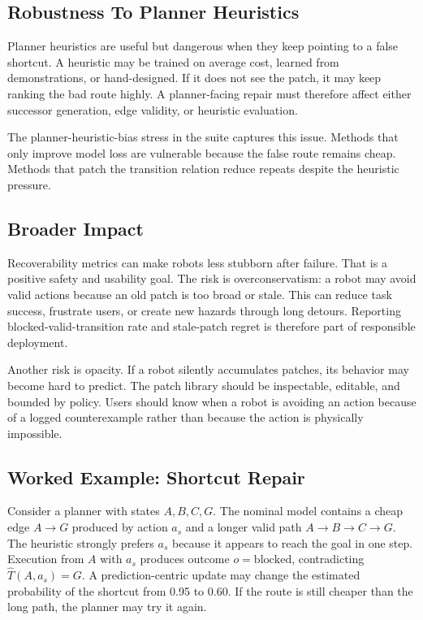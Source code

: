 \documentclass{article}
\newcommand{\model}{\hat{T}}
\begin{document}
\subsection{Robustness To Planner Heuristics}

Planner heuristics are useful but dangerous when they keep pointing to a false
shortcut. A heuristic may be trained on average cost, learned from demonstrations,
or hand-designed. If it does not see the patch, it may keep ranking the bad
route highly. A planner-facing repair must therefore affect either successor
generation, edge validity, or heuristic evaluation.

The planner-heuristic-bias stress in the suite captures this issue. Methods
that only improve model loss are vulnerable because the false route remains
cheap. Methods that patch the transition relation reduce repeats despite the
heuristic pressure.

\subsection{Broader Impact}

Recoverability metrics can make robots less stubborn after failure. That is a
positive safety and usability goal. The risk is overconservatism: a robot may
avoid valid actions because an old patch is too broad or stale. This can reduce
task success, frustrate users, or create new hazards through long detours.
Reporting blocked-valid-transition rate and stale-patch regret is therefore
part of responsible deployment.

Another risk is opacity. If a robot silently accumulates patches, its behavior
may become hard to predict. The patch library should be inspectable, editable,
and bounded by policy. Users should know when a robot is avoiding an action
because of a logged counterexample rather than because the action is physically
impossible.

\subsection{Worked Example: Shortcut Repair}

Consider a planner with states $A,B,C,G$. The nominal model contains a cheap
edge $A \rightarrow G$ produced by action $a_s$ and a longer valid path
$A \rightarrow B \rightarrow C \rightarrow G$. The heuristic strongly prefers
$a_s$ because it appears to reach the goal in one step. Execution from $A$ with
$a_s$ produces outcome $o=\mathrm{blocked}$, contradicting
$\model(A,a_s)=G$. A prediction-centric update may change the estimated
probability of the shortcut from 0.95 to 0.60. If the route is still cheaper
than the long path, the planner may try it again.
\end{document}
